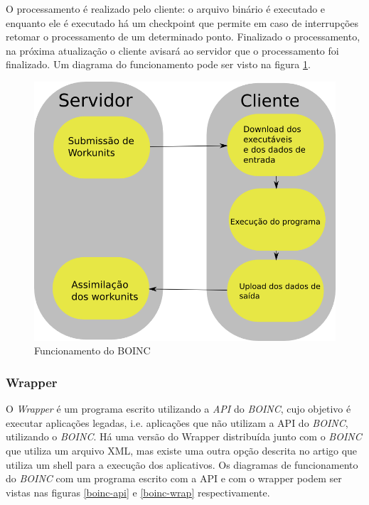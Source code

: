 O processamento é realizado pelo cliente: o arquivo binário é executado e enquanto ele é executado há um checkpoint
que permite em caso de interrupções retomar o processamento de um determinado ponto. Finalizado o processamento, 
na próxima atualização o cliente avisará ao servidor que o processamento foi finalizado. Um diagrama do funcionamento pode
ser visto na figura \ref{funcionamento-boinc}. 


\begin{figure}[!h]
  \centering
  \includegraphics[scale=0.5]{boinc-schema.png}
  \caption{Funcionamento do BOINC}
  \label{funcionamento-boinc}
\end{figure}

\newpage

\subsubsection{Wrapper}


O \emph{Wrapper} é um programa escrito utilizando a \emph{API} do \emph{BOINC}, cujo objetivo é executar aplicações legadas, 
i.e. aplicações que não utilizam a API do \emph{BOINC}, utilizando o \textit{BOINC}. Há uma versão do Wrapper distribuída junto com o 
\textit{BOINC} que utiliza um arquivo XML, mas existe uma outra opção descrita no artigo \cite{hungaro} que utiliza um shell para a 
execução dos aplicativos. Os diagramas de funcionamento do 
\emph{BOINC} com um programa escrito com a API e com o wrapper podem ser vistas nas figuras \ref{boinc-api} e \ref{boinc-wrap} 
respectivamente.


